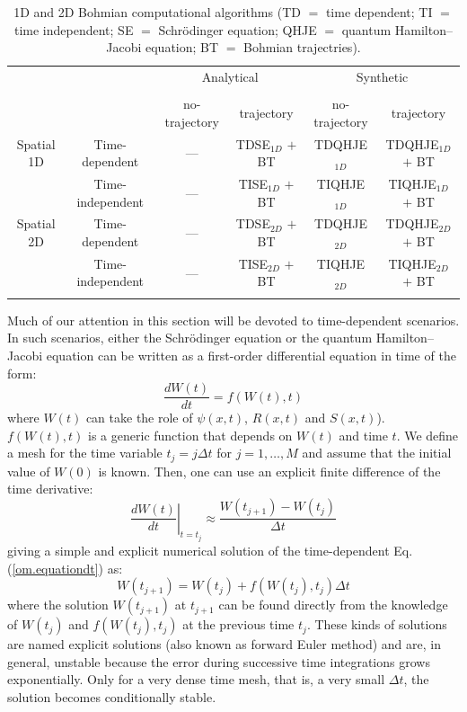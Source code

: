 \documentclass[onecolumn,nofootinbib, secnumarabic, amsmath, nobibnotes,12pt,aps,pra]{revtex4-1}
\newcommand{\eref}[1]{Eq. (\ref{#1})}
\begin{document}
\begin{table}
\caption{1D and 2D Bohmian computational algorithms (TD $=$ time dependent; TI $=$ time independent; SE $=$ Schr\"odinger equation; QHJE $=$ quantum Hamilton--Jacobi equation; BT $=$ Bohmian trajectries).}{%
\begin{tabular}{@{}cccccc@{}} \toprule
 & & \multicolumn{2}{c}{Analytical} & \multicolumn{2}{c}{Synthetic} \\
 \cline{3-6}\\[-10pt]
 & & no-trajectory & trajectory & no-trajectory & trajectory \\ \colrule
 Spatial 1D & Time-dependent & --- & TDSE$_{1D}$ $+$ BT & TDQHJE$_{1D}$ & TDQHJE$_{1D}$ $+$ BT\\
 & Time-independent & --- & TISE$_{1D}$ $+$ BT & TIQHJE$_{1D}$ & TIQHJE$_{1D}$ $+$ BT\\ \botrule
 Spatial 2D & Time-dependent & --- & TDSE$_{2D}$ $+$ BT & TDQHJE$_{2D}$ & TDQHJE$_{2D}$ $+$ BT\\
 & Time-independent & --- & TISE$_{2D}$ $+$ BT & TIQHJE$_{2D}$ & TIQHJE$_{2D}$ $+$ BT\\ \botrule
\end{tabular}}\label{tblA.1}
\end{table}

Much of our attention in this section will be devoted to
time-dependent scenarios. In such scenarios, either the
Schr\"odinger equation or the quantum Hamilton--Jacobi equation can
be written as a first-order differential equation in time of the
form:\enlargethispage{-1pc}
\begin{equation}
\label{om.equationdt}
\frac {dW(t)} {dt} = f(W(t),t)
\end{equation}
where $W(t)$ can take the role of $\psi(x,t)$, $R(x,t)$ and
$S(x,t)$). $f(W(t),t)$ is a generic function that depends on $W(t)$
and time $t$.  We define a mesh for the time variable $t_j = j
\Delta t$ for $j = 1,\ldots,M$ and assume that the initial value of
$W(0)$ is known. Then, one can use an explicit finite difference of
the time derivative:
\begin{equation}
\left.\frac {dW(t)} {dt}\right|_{t = t_j} \approx \frac {W(t_{j + 1})-W(t_j)} {\Delta t}
\end{equation}
giving a simple and explicit numerical solution of the time-dependent \eref{om.equationdt} as:
\begin{equation}
\label{om.explicit}
W(t_{j + 1}) = W(t_j) + f(W(t_j),t_j) \Delta t
\end{equation}
where the solution $W(t_{j + 1})$ at $t_{j + 1}$ can be found
directly from the knowledge of $W(t_j)$ and $f(W(t_j),t_j)$ at the
previous time $t_j$. These kinds of solutions are named explicit
solutions  (also known as forward Euler method) and are, in general,
unstable because the error during successive time integrations grows
exponentially. Only for a very dense time mesh, that is, a very
small $\Delta t$, the solution becomes conditionally stable.
\end{document}
